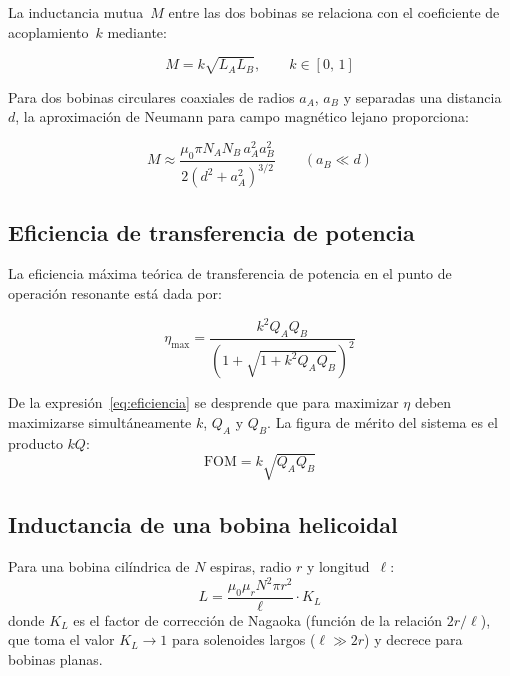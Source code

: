 \documentclass[11pt,a4paper]{article}
\begin{document}
La inductancia mutua~$M$ entre las dos bobinas se relaciona con el coeficiente de
acoplamiento~$k$ mediante:

\begin{formulabox}
\begin{equation}
  M = k\sqrt{L_A L_B}, \qquad k \in [0,\,1]
  \label{eq:mutua}
\end{equation}
\end{formulabox}

Para dos bobinas circulares coaxiales de radios $a_A$, $a_B$ y separadas una distancia~$d$,
la aproximación de Neumann para campo magnético lejano proporciona:

\begin{equation}
  M \approx \frac{\mu_0 \pi N_A N_B\, a_A^2 a_B^2}{2\left(d^2 + a_A^2\right)^{3/2}}
  \qquad (a_B \ll d)
  \label{eq:Neumann}
\end{equation}

\subsection{Eficiencia de transferencia de potencia}

La eficiencia máxima teórica de transferencia de potencia en el punto de operación resonante
está dada por:

\begin{formulabox}
\begin{equation}
  \eta_{\max} = \frac{k^2 Q_A Q_B}{\left(1 + \sqrt{1 + k^2 Q_A Q_B}\right)^2}
  \label{eq:eficiencia}
\end{equation}
\end{formulabox}

De la expresión~\eqref{eq:eficiencia} se desprende que para maximizar $\eta$ deben maximizarse
simultáneamente $k$, $Q_A$ y $Q_B$. La figura de mérito del sistema es el producto $kQ$:
\begin{equation}
  \text{FOM} = k\sqrt{Q_A Q_B}
  \label{eq:FOM}
\end{equation}

\subsection{Inductancia de una bobina helicoidal}

Para una bobina cilíndrica de $N$ espiras, radio $r$ y longitud~$\ell$:
\begin{equation}
  L = \frac{\mu_0 \mu_r N^2 \pi r^2}{\ell} \cdot K_L
  \label{eq:inductancia}
\end{equation}
donde $K_L$ es el factor de corrección de Nagaoka (función de la relación $2r/\ell$), que toma el
valor $K_L \to 1$ para solenoides largos ($\ell \gg 2r$) y decrece para bobinas planas.
\end{document}
